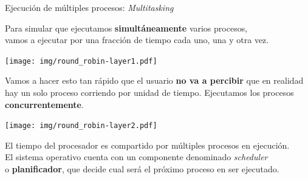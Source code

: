 \documentclass[aspectratio=169]{beamer}
\begin{document}
\begin{frame}{Ejecución de múltiples procesos: \emph{Multitasking}}
    \begin{center}
    Para simular que ejecutamos \textbf{simultáneamente} varios procesos,\\ vamos a ejecutar por una fracción de tiempo cada uno, una y otra vez.
    \end{center}
    \begin{center}
        \texttt{[image: img/round\_robin-layer1.pdf]}
    \end{center}
    \pause
    \textcolor{verdeuca}{Vamos a hacer esto tan rápido que el usuario \textbf{no va a percibir} que en realidad hay un solo proceso corriendo por unidad de tiempo.}
    Ejecutamos los procesos \textbf{concurrentemente}.\\
    \begin{center}
        \texttt{[image: img/round\_robin-layer2.pdf]}
    \end{center}
    \pause
    \begin{center}
    \textcolor{naranjauca}{El tiempo del procesador es compartido por múltiples procesos en ejecución.}\\
    \vspace{0.2cm}
    \small
    El sistema operativo cuenta con un componente denominado \emph{scheduler}\\ o \textbf{planificador}, que decide cual será el próximo proceso en ser ejecutado.
    \end{center}
\end{frame}
\end{document}
